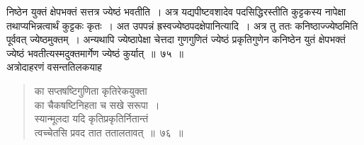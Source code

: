 \documentclass[11pt, openany]{book}
\begin{document}
\noindent निष्ठेन युक्तं क्षेपभक्तं सत्तत्र ज्येष्ठं भवतीति~। अत्र यद्यपीष्टवशादेव
पदसिद्धिरस्तीति कुट्टकस्य नापेक्षा तथाप्यभिन्नत्वार्थं कुट्टकः कृतः~। अत उपपन्नं
ह्रस्वज्येष्ठपदक्षेपानित्यादि~। अत्र तु ततः कनिष्ठाज्ज्येष्ठमिति पूर्ववत् ज्येष्ठमुक्तम्~।
अन्यथापि ज्येष्ठापेक्षा चेत्तदा गुणगुणितं ज्येष्ठं प्रकृतिगुणेन कनिष्ठेन युतं
क्षेपभक्तं ज्येष्ठं भवतीत्यस्मदुक्तमार्गेण ज्येष्ठं कुर्यात्~॥~७५~॥~\\

\vspace{-2mm}
 अत्रोदाहरणं वसन्ततिलकयाह\textendash 
\begin{quote}
    \eg
    का सप्तषष्टिगुणिता कृतिरेकयुक्ता \\
    का चैकषष्टिनिहता च सखे सरूपा~। \\
 स्यान्मूलदा यदि कृतिप्रकृतिर्नितान्तं \\
 त्वच्चेतसि प्रवद तात ततालतावत्~॥~७६~॥
\end{quote}
 
\end{document}
